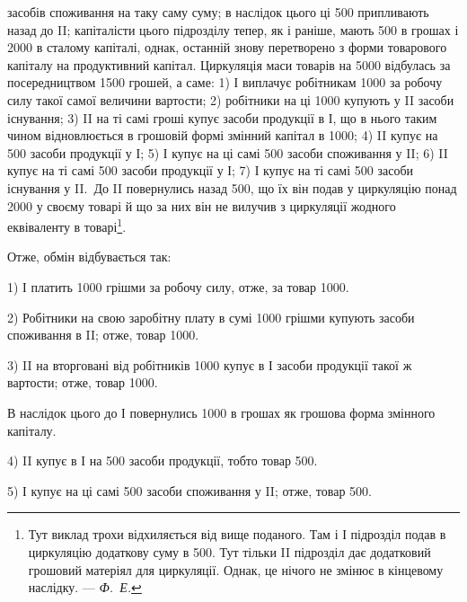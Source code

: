 \parcont{}  %
засобів споживання на таку саму суму; в наслідок цього ці 500
припливають назад до II; капіталісти цього підрозділу тепер, як і раніше,
мають 500 в грошах і 2000 в сталому капіталі,
однак, останній знову перетворено з форми товарового капіталу на продуктивний
капітал. Циркуляція маси товарів на 5000 відбулась
за посередництвом 1500 грошей, а саме: 1) І виплачує робітникам
1000 за робочу силу такої самої величини вартости;
2) робітники на ці 1000 купують у II засоби існування;
3) II на ті самі гроші купує засоби продукції в І, що в нього таким
чином відновлюється в грошовій формі змінний капітал в 1000;
4) II купує на 500 засоби продукції у І;
5) І купує на ці самі 500 засоби споживання у II;
6) II купує на ті самі 500 засоби продукції у І;
7) І купує на ті самі 500 засоби
існування у II.~До II повернулись назад 500, що їх він подав у
циркуляцію понад 2000 у своєму товарі й що за них він не
вилучив з циркуляції жодного еквіваленту в товарі\footnote{
Тут виклад трохи відхиляється від вище поданого. Там і
І підрозділ подав в циркуляцію додаткову суму в 500. Тут тільки II підрозділ дає
додатковий грошовий матеріял для циркуляції. Однак, це нічого не змінює в
кінцевому наслідку. — \emph{Ф.~Е.}}.

Отже, обмін відбувається так:

1) І платить 1000 грішми за робочу силу, отже, за товар \deq{} 1000.

2) Робітники на свою заробітну плату в сумі 1000 грішми
купують засоби споживання в II; отже, товар \deq{} 1000.

3) II на вторговані від робітників 1000 купує в І засоби
продукції такої ж вартости; отже, товар \deq{} 1000.

В наслідок цього до І повернулись 1000 в грошах як грошова
форма змінного капіталу.

4) II купує в І на 500 засоби продукції, тобто товар \deq{}
500.

5) І купує на ці самі 500 засоби споживання у II; отже,
товар \deq{} 500.

